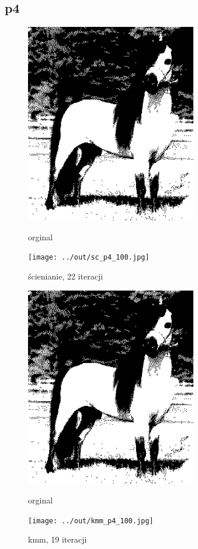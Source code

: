 \documentclass[a4paper,12pt]{article}
\begin{document}
\newpage
\subsection{p4}

\begin{figure}[h!]
\begin{minipage}[t]{7.5cm}
\begin{center}
\includegraphics[width=7.5cm]{../in/p4.jpg}
\caption{orginal}
\end{center}
\end{minipage}
\hfill
\begin{minipage}[t]{7.5cm}
\begin{center}
\texttt{[image: ../out/sc\_p4\_100.jpg]}
\caption{ścienianie, 22 iteracji}
\end{center}
\end{minipage}
\end{figure}

\begin{figure}[h!]
\begin{minipage}[t]{7.5cm}
\begin{center}
\includegraphics[width=7.5cm]{../in/p4.jpg}
\caption{orginal}
\end{center}
\end{minipage}
\hfill
\begin{minipage}[t]{7.5cm}
\begin{center}
\texttt{[image: ../out/kmm\_p4\_100.jpg]}
\caption{kmm, 19 iteracji}
\end{center}
\end{minipage}
\end{figure}
\end{document}
